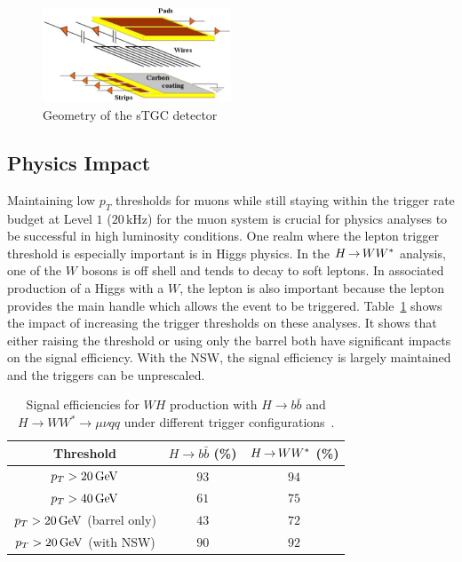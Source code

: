 \begin{figure}[h!]
  \centering
  \captionsetup{justification=centering}

  \includegraphics[width=0.5\textwidth]{figures/stgc}
   \caption{Geometry of the sTGC detector~\cite{NSW_TDR}}
  \label{fig:stgc}
\end{figure}

\subsection{Physics Impact}

Maintaining low $p_{T}$ thresholds for muons while still staying within the trigger rate budget at Level $1$ ($20\,\textrm{kHz}$) for the muon system is crucial for physics analyses to be successful in high luminosity conditions. One realm where the lepton trigger threshold is especially important is in Higgs physics. In the $H{\,{\rightarrow}\,}WW^\ast$ analysis, one of the $W$ bosons is off shell and tends to decay to soft leptons. In associated production of a Higgs with a $W$, the lepton is also important because the lepton provides the main handle which allows the event to be triggered. Table~\ref{tab:NSW_trig_efficiencies} shows the impact of increasing the trigger thresholds on these analyses. It shows that either raising the threshold or using only the barrel both have significant impacts on the signal efficiency. With the NSW, the signal efficiency is largely maintained and the triggers can be unprescaled.

\begin{table}[h!]
\centering
\captionsetup{justification=centering}

\hspace{-10pt}
\begin{tabular}{|c|c|c|}
\hline
Threshold & $H\to b\bar{b}$ (\%) & $H{\,{\rightarrow}\,}WW^\ast$ (\%) \\ \hline
$p_{T} > 20 \GeV$ & $93$ & $94$ \\ \hline
$p_{T} > 40 \GeV$ & $61$ & $75$ \\ \hline
$p_{T} > 20 \GeV$ (barrel only) & $43$ & $72$ \\ \hline
$p_{T} > 20 \GeV$ (with NSW) & $90$ & $92$ \\ \hline
\end{tabular}

\caption{
Signal efficiencies for $WH$ production with $H\to b\bar{b}$ and $H\to WW^* \to \mu \nu qq$ under different trigger configurations~\cite{NSW_TDR}.
}
\label{tab:NSW_trig_efficiencies}
\end{table}

